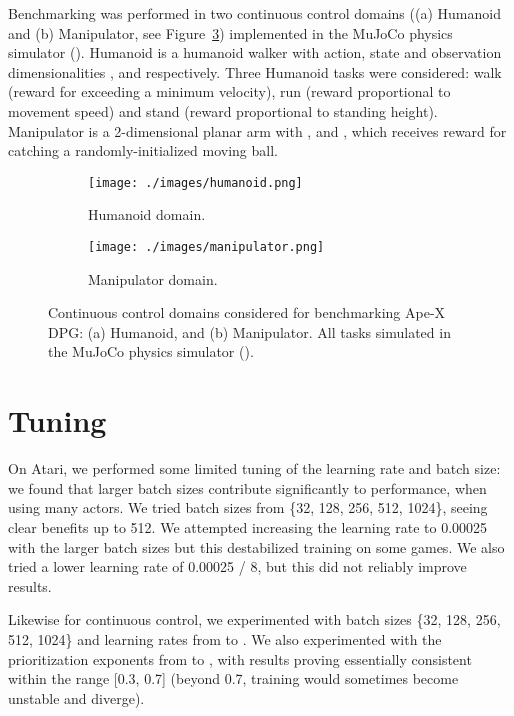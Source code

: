 \documentclass{article} \PassOptionsToPackage{usenames,dvipsnames}{xcolor}
\def\apex{Ape-X}
\begin{document}
Benchmarking was performed in two continuous control domains ((a) Humanoid and (b) Manipulator, see Figure~\ref{fig:suite_tasks}) implemented in the MuJoCo physics simulator (\cite{todorov2012mujoco}). Humanoid is a humanoid walker with action, state and observation dimensionalities ,  and  respectively. Three Humanoid tasks were considered: walk (reward for exceeding a minimum velocity), run (reward proportional to movement speed) and stand (reward proportional to standing height). Manipulator is a 2-dimensional planar arm with ,  and , which receives reward for catching a randomly-initialized moving ball.

\begin{figure}[h!]
\centering
\begin{subfigure}{.5\textwidth}
  \centering
  \texttt{[image: ./images/humanoid.png]}
  \caption{Humanoid domain.}
  \label{fig:sub1}
\end{subfigure}\begin{subfigure}{.5\textwidth}
  \centering
  \texttt{[image: ./images/manipulator.png]}
  \caption{Manipulator domain.}
  \label{fig:sub2}
\end{subfigure}
\caption{Continuous control domains considered for benchmarking {\apex} DPG: (a) Humanoid, and (b) Manipulator. All tasks simulated in the MuJoCo physics simulator (\cite{todorov2012mujoco}).}
\label{fig:suite_tasks}
\end{figure}


\section{Tuning}
On Atari, we performed some limited tuning of the learning rate and batch size: we found that larger batch sizes contribute significantly to performance, when using many actors. We tried batch sizes from \{32, 128, 256, 512, 1024\}, seeing clear benefits up to 512. We attempted increasing the learning rate to 0.00025 with the larger batch sizes but this destabilized training on some games. We also tried a lower learning rate of 0.00025 / 8, but this did not reliably improve results.

Likewise for continuous control, we experimented with batch sizes \{32, 128, 256, 512, 1024\} and learning rates from  to . We also experimented with the prioritization exponents  from  to , with results proving essentially consistent within the range [0.3, 0.7] (beyond 0.7, training would sometimes become unstable and diverge).
\end{document}
